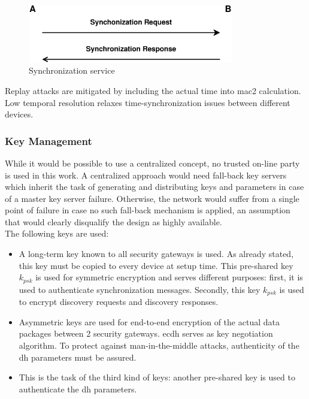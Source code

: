 \begin{figure}
  \centering
    \includegraphics[width=0.8\textwidth]{figures/protSync.eps}
 \caption{Synchronization service}
 \label{fig:syncProt}
\end{figure}
Replay attacks are mitigated by including the actual time into \gls{mac2} calculation. Low temporal resolution relaxes time-synchronization issues between
different devices.

\subsubsection{Key Management}

While it would be possible to use a centralized concept, no trusted on-line party is used in this work. A centralized approach would need fall-back key servers
which inherit the task of generating and distributing keys and parameters in case of a master key server failure. Otherwise, the network would suffer from a
single point of failure in case no such fall-back mechanism is applied, an assumption that would clearly disqualify the design as highly available.
\\
The following keys are used:

\begin{itemize}
 \item A long-term key known to all security gateways is used. As already stated, this key must be copied to every device at setup time. 
This pre-shared key $k_{psk}$ is used for symmetric encryption and serves different purposes: first, it is used to authenticate synchronization messages.
Secondly, this key $k_{psk}$ is used to encrypt discovery requests and discovery responses.
 \item Asymmetric keys are used for end-to-end encryption of the actual data packages between 2 security gateways. \gls{ecdh} serves as key negotiation algorithm.
 To protect against man-in-the-middle attacks, authenticity of the \gls{dh} parameters must be assured.
 \item This is the task of the third kind of keys: another pre-shared key is used to authenticate the \gls{dh} parameters.
\end{itemize}


